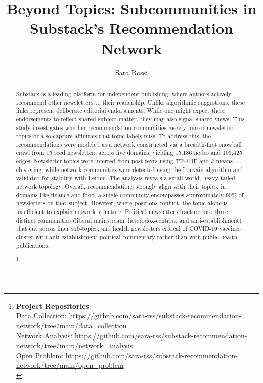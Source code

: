 \documentclass[sigchi]{acmart}
\begin{document}
%
\title{Beyond Topics: Subcommunities in Substack's Recommendation Network}

%
\author{Sara Rossi}

\renewcommand{\shortauthors}{Rossi}


\begin{abstract}
Substack is a leading platform for independent publishing, where authors actively recommend other newsletters to their readership. Unlike algorithmic suggestions, these links represent deliberate editorial endorsements. While one might expect these endorsements to reflect shared subject matter, they may also signal shared views. This study investigates whether recommendation communities merely mirror newsletter topics or also capture affinities that topic labels miss. To address this, the recommendations were modeled as a network constructed via a breadth-first snowball crawl from 15 seed newsletters across five domains, yielding 15{,}186 nodes and 103{,}425 edges. Newsletter topics were inferred from post texts using TF--IDF and $k$-means clustering, while network communities were detected using the Louvain algorithm and validated for stability with Leiden. The analysis reveals a small-world, heavy-tailed network topology. Overall, recommendations strongly align with their topics: in domains like finance and food, a single community encompasses approximately 90\% of newsletters on that subject. However, where positions conflict, the topic alone is insufficient to explain network structure. Political newsletters fracture into three distinct communities (liberal mainstream, heterodox-centrist, and anti-establishment) that cut across finer sub-topics, and health newsletters critical of COVID-19 vaccines cluster with anti-establishment political commentary rather than with public-health publications.

\footnote{
\raggedright
{\bf Project Repositories}\\
\noindent Data Collection: \url{https://github.com/sara-rss/substack-recommendation-network/tree/main/data_collection}\\
\noindent Network Analysis: \url{https://github.com/sara-rss/substack-recommendation-network/tree/main/network_analysis}\\
\noindent Open Problem: \url{https://github.com/sara-rss/substack-recommendation-network/tree/main/open_problem}\\
}
\end{abstract}
\end{document}
